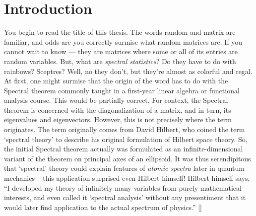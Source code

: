 
  \chapter*{Introduction}


You begin to read the title of this thesis. The words random and matrix are familiar, and odds are you correctly surmise what random matrices are.
If you cannot wait to know --- they are matrices where some or all of its entries are random variables.
But, what are \textit{spectral statistics}? Do they have to do with rainbows? Sceptres? Well, no they don’t, but they’re almost as colorful and regal. \\


At first, one might surmise that the origin of the word has to do with the Spectral theorem commonly taught in a first-year linear algebra or functional analysis course.
This would be partially correct. For context, the Spectral theorem is concerned with the diagonalization of a matrix, and in turn, its eigenvalues
and eigenvectors. However, this is not precisely where the term originates.
The term originally comes from David Hilbert, who coined the term `spectral theory' to describe his original formulation of Hilbert space theory.
So, the initial Spectral theorem actually was formulated as an infinite-dimensional variant of the theorem on principal axes of an ellipsoid.
It was thus serendipitous that `spectral' theory could explain features of \textit{atomic spectra} later in quantum mechanics -- this application surprised even Hilbert himself!
Hilbert himself says, ``I developed my theory of infinitely many variables from purely mathematical interests,
and even called it `spectral analysis' without any presentiment that it would later find application to the actual spectrum of physics.'' [\cite{steen}] \\

